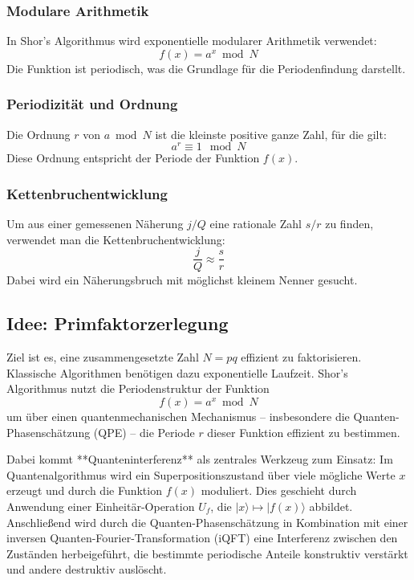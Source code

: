 \subsubsection*{Modulare Arithmetik}
In Shor's Algorithmus wird exponentielle modularer Arithmetik verwendet:
\[
f(x) = a^x \bmod N
\]
Die Funktion ist periodisch, was die Grundlage für die Periodenfindung darstellt.

\subsubsection*{Periodizität und Ordnung}
Die Ordnung \( r \) von \( a \bmod N \) ist die kleinste positive ganze Zahl, für die gilt:
\[
a^r \equiv 1 \mod N
\]
Diese Ordnung entspricht der Periode der Funktion \( f(x) \).

\subsubsection*{Kettenbruchentwicklung}
Um aus einer gemessenen Näherung \( j/Q \) eine rationale Zahl \( s/r \) zu finden, verwendet man die Kettenbruchentwicklung:
\[
\frac{j}{Q} \approx \frac{s}{r}
\]
Dabei wird ein Näherungsbruch mit möglichst kleinem Nenner gesucht.

\subsection{Idee: Primfaktorzerlegung}
Ziel ist es, eine zusammengesetzte Zahl \( N = pq \) effizient zu faktorisieren. Klassische Algorithmen benötigen dazu exponentielle Laufzeit. Shor's Algorithmus nutzt die Periodenstruktur der Funktion
\[
f(x) = a^x \bmod N
\]
um über einen quantenmechanischen Mechanismus – insbesondere die Quanten-Phasenschätzung (QPE) – die Periode \( r \) dieser Funktion effizient zu bestimmen.

\noindent Dabei kommt **Quanteninterferenz** als zentrales Werkzeug zum Einsatz: Im Quantenalgorithmus wird ein Superpositionszustand über viele mögliche Werte \( x \) erzeugt und durch die Funktion \( f(x) \) moduliert. Dies geschieht durch Anwendung einer Einheitär-Operation \( U_f \), die \( |x\rangle \mapsto |f(x)\rangle \) abbildet. Anschließend wird durch die Quanten-Phasenschätzung in Kombination mit einer inversen Quanten-Fourier-Transformation (iQFT) eine Interferenz zwischen den Zuständen herbeigeführt, die bestimmte periodische Anteile konstruktiv verstärkt und andere destruktiv auslöscht.\\


